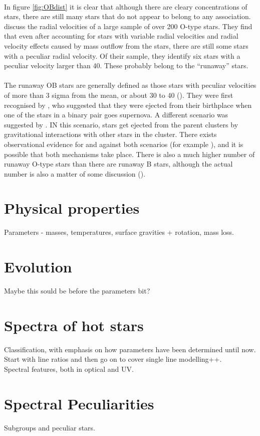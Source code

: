 \paragraph{}
In figure \ref{fig:OBdist} it is clear that although there are cleary
concentrations of stars, there are still many stars that do not appear
to belong to any association.  discuss the radial velocities
of a large sample of over 200 O-type stars. They find that even after
accounting for stars with variable radial velocities and radial velocity
effects caused by mass outflow from the stars, there are still some stars
with a peculiar radial velocity. Of their sample, they identify
six stars with a peculiar velocity larger than 40\kms. These probably
belong to the ``runaway'' stars.

\paragraph{}
The runaway OB stars are generally defined as 
those stars with peculiar velocities
of more than 3 sigma from the mean, or about 30 to 40\kms 
(\cite{bl:runaway,un:monograph}).
They were first recognised by , who suggested that they
were ejected from their birthplace when one of the stars in a binary pair goes
supernova. A different scenario was suggested by . IN this
scenario, stars get ejected from the parent clusters by gravitational
interactions with other stars in the cluster. There exists observational
evidence for and against both scenarios (for example 
\cite{le:runawayII,st:runaway,mo:hipparcosI}),
and it is possible that both mechanisms take place. There is also a much
higher number of runaway O-type stars than there are runaway B stars, 
although the actual number is also a matter of some discussion 
(\cite{st:runaway}).


\section{Physical properties}
Parameters - masses, temperatures, surface gravities + rotation,
	mass loss.

\section{Evolution}
Maybe this sould be before the parameters bit?

\section{Spectra of hot stars}
Classification, with emphasis on how parameters have been
determined until now. Start with line ratios and then go on
to cover single line modelling++. \\
Spectral features, both in optical and UV.

\section{Spectral Peculiarities}
Subgroups and peculiar stars.
